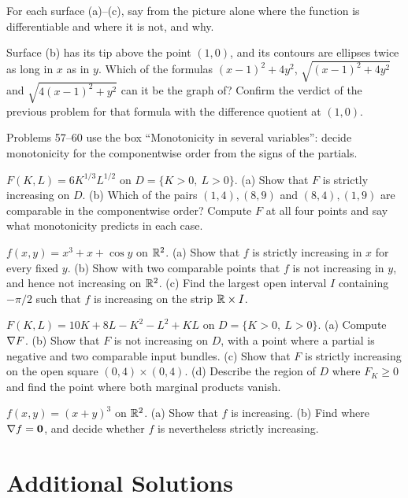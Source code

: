 \begin{problems}[resume]
  \item For each surface (a)--(c), say from the picture alone where the
        function is differentiable and where it is not, and why.
  \item Surface (b) has its tip above the point $(1,0)$, and its contours
        are ellipses twice as long in $x$ as in $y$. Which of the formulas
        $(x-1)^{2}+4y^{2}$, $\sqrt{(x-1)^{2}+4y^{2}}$ and
        $\sqrt{4(x-1)^{2}+y^{2}}$ can it be the graph of? Confirm the
        verdict of the previous problem for that formula with the
        difference quotient at $(1,0)$.
\end{problems}

Problems 57--60 use the box ``Monotonicity in several variables'': decide
monotonicity for the componentwise order from the signs of the partials.

\begin{problems}[resume]
  \item $F(K,L)=6K^{1/3}L^{1/2}$ on $D=\{K>0,\ L>0\}$. (a) Show that $F$
        is strictly increasing on $D$. (b) Which of the pairs
        $(1,4),(8,9)$ and $(8,4),(1,9)$ are comparable in the componentwise
        order? Compute $F$ at all four points and say what monotonicity
        predicts in each case.
  \item $f(x,y)=x^{3}+x+\cos y$ on $\mathbb{R}^{2}$. (a) Show that $f$ is strictly
        increasing in $x$ for every fixed $y$. (b) Show with two comparable
        points that $f$ is not increasing in $y$, and hence not increasing
        on $\mathbb{R}^{2}$. (c) Find the largest open interval $I$ containing
        $-\pi/2$ such that $f$ is increasing on the strip $\mathbb{R}\times I$.
  \item $F(K,L)=10K+8L-K^{2}-L^{2}+KL$ on $D=\{K>0,\ L>0\}$.
        (a) Compute $\nabla F$. (b) Show that $F$ is not increasing on $D$,
        with a point where a partial is negative and two comparable input
        bundles. (c) Show that $F$ is strictly increasing on the open
        square $(0,4)\times(0,4)$. (d) Describe the region of $D$ where
        $F_{K}\ge0$ and find the point where both marginal products vanish.
  \item $f(x,y)=(x+y)^{3}$ on $\mathbb{R}^{2}$. (a) Show that $f$ is
        increasing. (b) Find where $\nabla f=\mathbf{0}$, and decide whether
        $f$ is nevertheless strictly increasing.
\end{problems}

\section{Additional Solutions}

